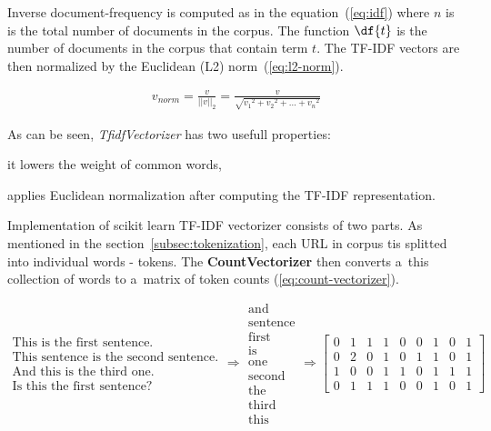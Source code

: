 Inverse document-frequency is computed as in the equation~(\ref{eq:idf}) where \( n \) is is the total number of documents in the corpus.
The function \( \df{t} \) is the number of documents in the corpus that contain term \( t \).
The TF-IDF vectors are then normalized by the Euclidean (L2) norm~(\ref{eq:l2-norm}).

\begin{align}
    v_{norm} = \frac{v}{||v||_2} = \frac{v}{\sqrt{v{_1}^2 +  v{_2}^2 + \dots + v{_n}^2}} \label{eq:l2-norm}
\end{align}

As can be seen, \textit{TfidfVectorizer} has two usefull properties:
\begin{enumerate*}[label=(\roman*)]
    \item it lowers the weight of common words,
    \item applies Euclidean normalization after computing the TF-IDF representation.
\end{enumerate*}

Implementation of scikit learn TF-IDF vectorizer consists of two parts.
As mentioned in the section~\ref{subsec:tokenization}, each URL in corpus tis splitted into individual words - tokens.
The \textbf{CountVectorizer} then converts a~this collection of words to a~matrix of token counts (\ref{eq:count-vectorizer}).

\begin{equation}
    \label{eq:count-vectorizer}
    \begin{matrix}
        \text{This is the first sentence.} \\
        \text{This sentence is the second sentence.} \\
        \text{And this is the third one.} \\
        \text{Is this the first sentence?}
    \end{matrix}
    \Rightarrow
    \begin{matrix}
        \text{and} \\ \text{sentence} \\ \text{first} \\ \text{is} \\ \text{one} \\ \text{second} \\ \text{the} \\ \text{third} \\ \text{this}
    \end{matrix}
    \Rightarrow
    \begin{bmatrix}
        0 & 1 & 1 & 1 & 0 & 0 & 1 & 0 & 1 \\
        0 & 2 & 0 & 1 & 0 & 1 & 1 & 0 & 1 \\
        1 & 0 & 0 & 1 & 1 & 0 & 1 & 1 & 1 \\
        0 & 1 & 1 & 1 & 0 & 0 & 1 & 0 & 1
    \end{bmatrix}
\end{equation}

